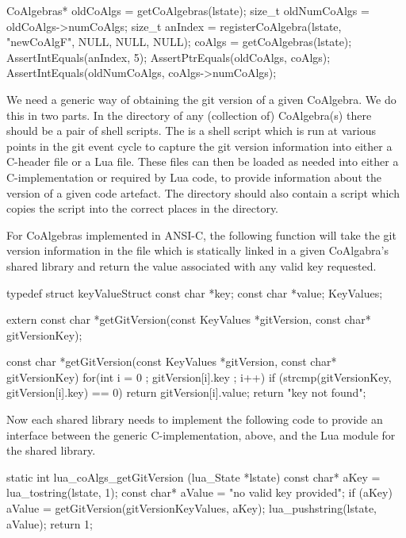 \startCTest
  CoAlgebras* oldCoAlgs = getCoAlgebras(lstate);
  size_t oldNumCoAlgs = oldCoAlgs->numCoAlgs;
  size_t anIndex = 
    registerCoAlgebra(lstate, "newCoAlgF", NULL, NULL, NULL);
  coAlgs = getCoAlgebras(lstate);
  AssertIntEquals(anIndex, 5);
  AssertPtrEquals(oldCoAlgs, coAlgs);
  AssertIntEquals(oldNumCoAlgs, coAlgs->numCoAlgs);
\stopCTest
\stopTestCase
\stopTestSuite

\startTestSuite[getGitVersion]

We need a generic way of obtaining the git version of a given CoAlgebra. 
We do this in two parts. In the  directory of any (collection 
of) CoAlgebra(s) there should be a pair of shell scripts. The 
 is a  shell script which is run at various 
points in the git event cycle to capture the git version information into 
either a C-header file or a Lua file. These files can then be loaded as 
needed into either a C-implementation or required by Lua code, to provide 
information about the version of a given code artefact. The  
directory should also contain a   script 
which copies the  script into the correct places in the 
 directory. 

For CoAlgebras implemented in ANSI-C, the following function will take the 
git version information in the  file which is 
statically linked in a given CoAlgabra's shared library and return the 
value associated with any valid key requested. 

\startCHeader
typedef struct keyValueStruct {
  const char *key;
  const char *value;
} KeyValues;

extern const char *getGitVersion(const KeyValues *gitVersion, 
                                 const char* gitVersionKey);
\stopCHeader

\startCCode
const char *getGitVersion(const KeyValues *gitVersion,
                          const char* gitVersionKey) {
  for(int i = 0 ; gitVersion[i].key ; i++) {
    if (strcmp(gitVersionKey, gitVersion[i].key) == 0) {
      return gitVersion[i].value;
    }
  }
  return "key not found";
}
\stopCCode

Now each shared library needs to implement the following code to provide 
an interface between the generic C-implementation, above, and the Lua 
module for the shared library. 

\startCCode
static int lua_coAlgs_getGitVersion (lua_State *lstate) {
  const char* aKey   = lua_tostring(lstate, 1);
  const char* aValue = "no valid key provided";
  if (aKey) aValue = getGitVersion(gitVersionKeyValues, aKey);
  lua_pushstring(lstate, aValue);
  return 1;
}


